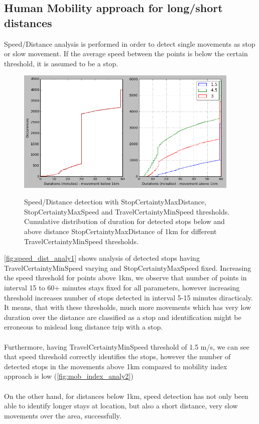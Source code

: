 \subsection{Human Mobility approach for long/short distances}

Speed/Distance analysis is performed in order to detect single movements as stop or slow movement. If the average speed between the points is below the certain threshold, it is assumed to be a stop. 
 
\begin{figure}[!ht]
	\centering
	\includegraphics[width=0.95\textwidth]{images/speed_dist_analy1.png}\\
	\caption{ Speed/Distance detection with StopCertaintyMaxDistance, StopCertaintyMaxSpeed and TravelCertaintyMinSpeed thresholds. Cumulative distribution of duration for detected stops below and above distance StopCertaintyMaxDistance of 1km for different  TravelCertaintyMinSpeed thresholds. }
	\label{fig:speed_dist_analy1}
\end{figure}
\FloatBarrier 

\autoref{fig:speed_dist_analy1} shows analysis of detected stops having TravelCertaintyMinSpeed varying and StopCertaintyMaxSpeed fixed. Increasing the speed threshold for points above 1km, we observe that number of points in interval 15 to 60+ minutes stays fixed for all parameters, however increasing threshold increases number of stops detected in interval 5-15 minutes diracticaly. It means, that with these thresholds, much more movements which has very low duration over the distance are classified as a stop and identification might be erroneous to mislead long distance trip with a stop. 
\\\\
Furthermore, having TravelCertaintyMinSpeed threshold of 1.5 m/s, we can see that speed threshold correctly identifies the stops, however the number of detected stops in the movements above 1km compared to mobility index approach is low (\autoref{fig:mob_index_analy2})
\\\\
On the other hand, for distances below 1km, speed detection has not only been able to identify longer stays at location, but also a short distance, very slow movements over the area, successfully. 

